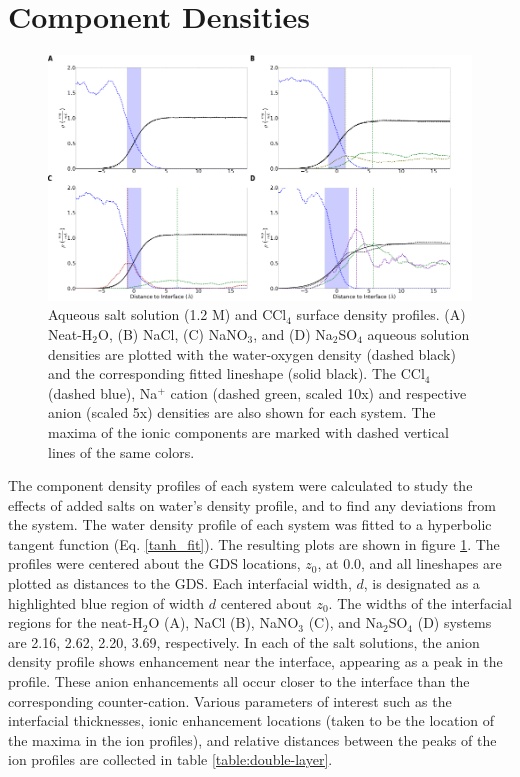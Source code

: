 \section{Component Densities}

\begin{figure}[h!]
\begin{center}
	\includegraphics[scale=1.0]{images/densities.png}
	\caption{Aqueous salt solution (1.2 M) and CCl$_4$ surface density profiles. (A) Neat-H$_2$O, (B) NaCl, (C) NaNO$_3$, and (D) Na$_2$SO$_4$ aqueous solution densities are plotted with the water-oxygen density (dashed black) and the corresponding fitted lineshape (solid black). The CCl$_4$ (dashed blue), Na$^+$ cation (dashed green, scaled 10x) and respective anion (scaled 5x) densities are also shown for each system. The maxima of the ionic components are marked with dashed vertical lines of the same colors.}
	\label{fig:density-plots}
\end{center}
\end{figure}

The component density profiles of each system were calculated to study the effects of added salts on water's density profile, and to find any deviations from the \ctcwat system. The water density profile of each system was fitted to a hyperbolic tangent function (Eq. \ref{tanh_fit}). The resulting plots are shown in figure \ref{fig:density-plots}. The profiles were centered about the GDS locations, $z_0$, at 0.0\angs, and all lineshapes are plotted as distances to the GDS. Each interfacial width, $d$, is designated as a highlighted blue region of width $d$ centered about $z_0$.  The widths of the interfacial regions for the neat-H$_2$O (A), NaCl (B), NaNO$_3$ (C), and Na$_2$SO$_4$ (D) systems are 2.16, 2.62, 2.20, 3.69\angs, respectively. In each of the salt solutions, the anion density profile shows enhancement near the interface, appearing as a peak in the profile. These anion enhancements all occur closer to the interface than the corresponding counter-cation. Various parameters of interest such as the interfacial thicknesses, ionic enhancement locations (taken to be the location of the maxima in the ion profiles), and relative distances between the peaks of the ion profiles are collected in table \ref{table:double-layer}.

